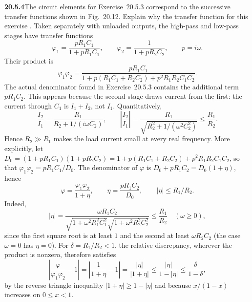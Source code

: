 \par\bigskip
\noindent\textbf{20.5.4}\quad The circuit elements for
Exercise~20.5.3 correspond to the successive transfer functions
shown in Fig.~20.12. Explain why the transfer function for this
exercise .
\solution
Taken separately with unloaded outputs, the high-pass
and low-pass stages have transfer functions
\[
\varphi_1=\frac{pR_1C_1}{1+pR_1C_1},\qquad
\varphi_2=\frac1{1+pR_2C_2},\qquad p=i\omega.
\]
Their product is
\[
\varphi_1\varphi_2=\frac{pR_1C_1}
{1+p(R_1C_1+R_2C_2)+p^2R_1R_2C_1C_2}.
\]
The actual denominator found in Exercise~20.5.3 contains the
additional term $pR_1C_2$. This appears because the second
stage draws current from the first: the current through $C_1$
is $I_1+I_2$, not $I_1$. Quantitatively,
\[
\frac{I_2}{I_1}=\frac{R_1}{R_2+1/(i\omega C_2)},\qquad
\left|\frac{I_2}{I_1}\right|
=\frac{R_1}{\sqrt{R_2^2+1/(\omega^2C_2^2)}}\le\frac{R_1}{R_2}.
\]
Hence $R_2\gg R_1$ makes the load current small at every real
frequency. More explicitly, let
$D_0=(1+pR_1C_1)(1+pR_2C_2)=1+p(R_1C_1+R_2C_2)+p^2R_1R_2C_1C_2$,
so that $\varphi_1\varphi_2=pR_1C_1/D_0$. The denominator of
$\varphi$ is $D_0+pR_1C_2=D_0(1+\eta)$, hence
\[
\varphi=\frac{\varphi_1\varphi_2}{1+\eta},\qquad
\eta=\frac{pR_1C_2}{D_0},\qquad |\eta|\le R_1/R_2.
\]
Indeed,
\[
|\eta|=\frac{\omega R_1C_2}
{\sqrt{1+\omega^2R_1^2C_1^2}\sqrt{1+\omega^2R_2^2C_2^2}}
\le\frac{R_1}{R_2}\quad(\omega\ge0),
\]
since the first square root is at least $1$ and the second
at least $\omega R_2C_2$ (the case $\omega=0$ has $\eta=0$).
For $\delta=R_1/R_2<1$, the relative discrepancy, wherever
the product is nonzero, therefore satisfies
\[
\left|\frac{\varphi}{\varphi_1\varphi_2}-1\right|
=\left|\frac1{1+\eta}-1\right|
=\frac{|\eta|}{|1+\eta|}\le\frac{|\eta|}{1-|\eta|}
\le\frac{\delta}{1-\delta},
\]
by the reverse triangle inequality $|1+\eta|\ge1-|\eta|$ and
because $x/(1-x)$ increases on $0\le x<1$.
